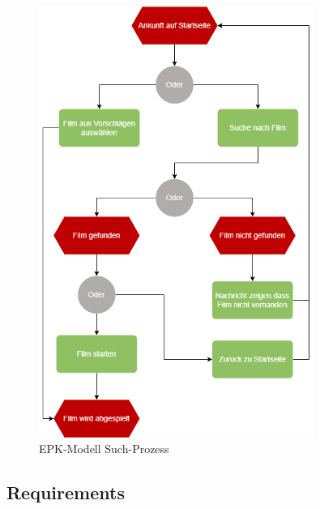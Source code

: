 \begin{appendix}
    \begin{figure}[ht]
        \centering
        \includegraphics[width=0.8\textwidth]{images/ReQ_MovieSearch_EPK}
        \caption{EPK-Modell Such-Prozess}
        \label{fig:epk_search}
    \end{figure}

    \subsection{Requirements}\label{subsec:requirements_catalouge}
    

\end{appendix}